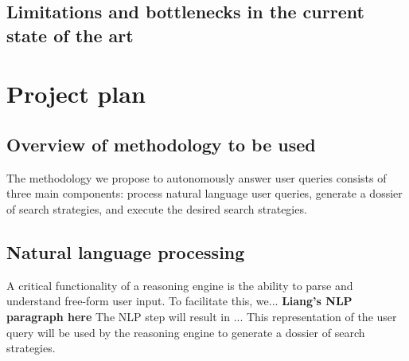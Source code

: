 \documentclass[11pt,notitlepage]{article}
\begin{document}
\subsection{Limitations and bottlenecks in the current state of the art}

\section{Project plan}
\subsection{Overview of methodology to be used}
The methodology we propose to autonomously answer user queries consists of three main components: process natural language user queries, generate a dossier of search strategies, and execute the desired search strategies.
\subsection{Natural language processing}
\label{section:NLP}
A critical functionality of a reasoning engine is the ability to parse and understand free-form user input. To facilitate this, we...
\textbf{Liang's NLP paragraph here}
The NLP step will result in ... This representation of the user query will be used by the reasoning engine to generate a dossier of search strategies. 
\end{document}
